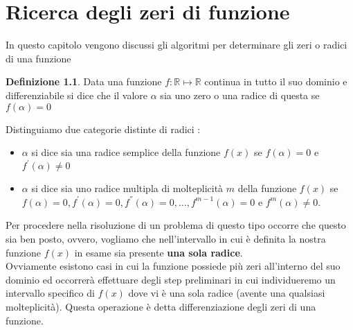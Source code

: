 \documentclass[12pt, a4paper]{book}
\theoremstyle{definition}
\newtheorem{defn}{Definizione}[section]
\begin{document}
\chapter{Ricerca degli zeri di funzione}
\begin{flushleft}

In questo capitolo vengono discussi gli algoritmi per determinare gli zeri o radici di una funzione 
\begin{defn}
Data una funzione $f : \mathbb{R} \mapsto \mathbb{R} $ continua in tutto il suo dominio e differenziabile si dice che il valore $\alpha$ sia uno zero o una radice di questa se $f(\alpha) = 0$

\begin{figure}[h!]
\centering
{}
\end{figure}
\end{defn}

Distinguiamo due categorie distinte di radici : 
\begin{itemize}
	\item $\alpha$ si dice sia una radice semplice della funzione $f(x)$ se $f(\alpha) = 0$ e $f^{'}(\alpha) \neq 0$ 
	\item $\alpha$ si dice sia uno radice multipla di molteplicità $m$ della funzione $f(x)$ se $f(\alpha) = 0,  f^{'}(\alpha) = 0, f^{''}(\alpha) = 0, \dots,  f^{m-1}(\alpha) = 0 $ e $f^{m}(\alpha) \neq 0$.
\end{itemize}

Per procedere nella risoluzione di un problema di questo tipo occorre che questo sia ben posto, ovvero, vogliamo che nell'intervallo in cui è definita la nostra funzione $f(x)$ in esame sia presente \textbf{una sola radice}. \\
Ovviamente esistono casi in cui la funzione possiede più zeri all'interno del suo dominio ed occorrerà effettuare degli step preliminari in cui individueremo un intervallo specifico di $f(x)$ dove vi è una sola radice (avente una qualsiasi molteplicità).
Questa operazione è detta differenziazione degli zeri di una funzione.

\begin{figure}[!h]
\centering
\begin{tikzpicture}


\end{tikzpicture}
\end{figure}
\end{flushleft}
\end{document}
